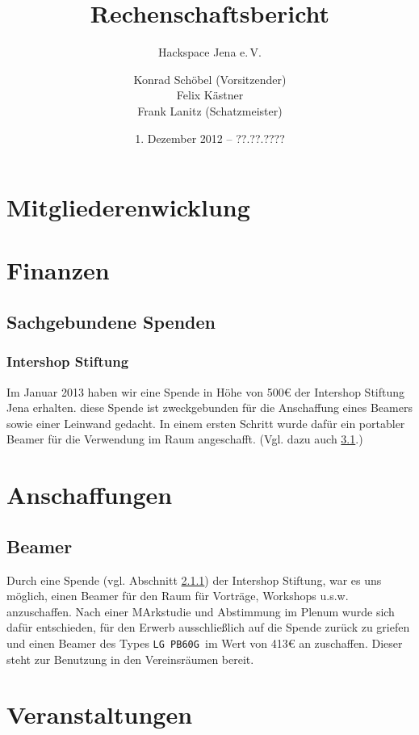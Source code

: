 \documentclass[10pt,DIV16]{scrartcl}
\title{Rechenschaftsbericht}
\subtitle{Hackspace Jena e.\,V.}
\author{%
	Konrad Schöbel (Vorsitzender)\\
	Felix Kästner\\
	Frank Lanitz (Schatzmeister)
}
\date{1. Dezember 2012 -- ??.??.????}
\begin{document}
\maketitle{}

\tableofcontents{}

\newpage{}

\section{Mitgliederenwicklung}
\section{Finanzen}

\subsection{Sachgebundene Spenden}
\subsubsection{Intershop Stiftung}
\label{sec:iss-spende}
Im Januar 2013 haben wir eine Spende in Höhe von 500\euro{} der Intershop
Stiftung Jena erhalten. diese Spende ist zweckgebunden für die
Anschaffung eines Beamers sowie einer Leinwand gedacht. In einem
ersten Schritt wurde dafür ein portabler Beamer für die Verwendung
im Raum angeschafft. (Vgl. dazu auch \ref{sec:beamerkauf}.)

\section{Anschaffungen}

\subsection{Beamer}
\label{sec:beamerkauf}

Durch eine Spende (vgl. Abschnitt \ref{sec:iss-spende}) der
Intershop Stiftung, war es uns möglich, einen Beamer für den Raum
für Vorträge, Workshops u.s.w. anzuschaffen. Nach einer MArkstudie
und Abstimmung im Plenum wurde sich dafür entschieden, für den
Erwerb ausschließlich auf die Spende zurück zu griefen und einen
Beamer des Types \texttt{LG PB60G }im Wert von 413\euro{} an
zuschaffen. Dieser steht zur Benutzung in den Vereinsräumen bereit.

\section{Veranstaltungen}
\end{document}
